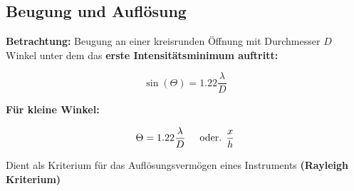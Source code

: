 \subsection{Beugung und Auflösung}
\textbf{Betrachtung:} Beugung an einer kreisrunden Öffnung mit Durchmesser $D$ \\[1ex]

Winkel unter dem das \textbf{erste Intensitätsminimum auftritt:}

\begin{formulabox}
    \[
        \sin{(\Theta)} = 1.22 \frac{\lambda}{D}
    \]
\end{formulabox}

\textbf{Für kleine Winkel:}

\begin{formulabox}
    \[
        \Theta = 1.22 \frac{\lambda}{D} \hspace{5mm} \text{oder. } \frac{x}{h}
    \]
\end{formulabox}

Dient als Kriterium für das Auflösungsvermögen eines Instruments \textbf{(Rayleigh Kriterium)}
